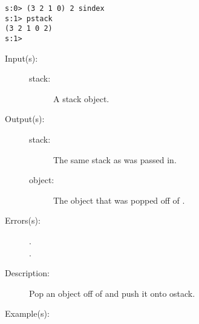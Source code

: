 \begin{description}
\begin{description}
\begin{verbatim}
s:0> (3 2 1 0) 2 sindex
s:1> pstack
(3 2 1 0 2)
s:1>
		\end{verbatim}
	\end{description}
\label{systemdict:spop}
\item[{\onyxop{stack}{spop}{stack object}}: ]
	\begin{description}\item[]
	\item[Input(s): ]
		\begin{description}\item[]
		\item[stack: ]
			A stack object.
		\end{description}
	\item[Output(s): ]
		\begin{description}\item[]
		\item[stack: ]
			The same stack as was passed in.
		\item[object: ]
			The object that was popped off of .
		\end{description}
	\item[Errors(s): ]
		\begin{description}\item[]
		\item[.]
		\item[.]
		\end{description}
	\item[Description: ]
		Pop an object off of  and push it onto ostack.
	\item[Example(s): ]\begin{verbatim}


\end{verbatim}
\end{description}
\end{description}
